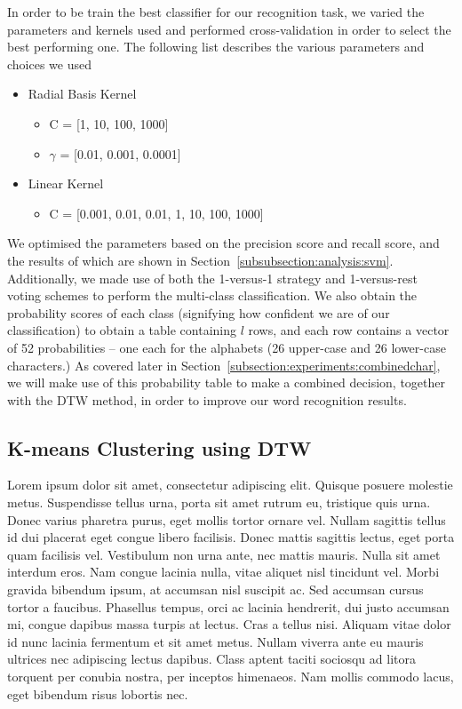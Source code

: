 \documentclass[12pt]{article}
\begin{document}
		In order to be train the best classifier for our recognition task, we varied the parameters and kernels used and performed cross-validation in order to select the best performing one. The following list describes the various parameters and choices we used

		\begin{itemize}
			\item Radial Basis Kernel
			\begin{itemize}
				\item C = [1, 10, 100, 1000]
				\item $\gamma$ = [0.01, 0.001, 0.0001]
			\end{itemize}
			\item Linear Kernel
			\begin{itemize}
				\item C = [0.001, 0.01, 0.01, 1, 10, 100, 1000]
			\end{itemize}
		\end{itemize}

		We optimised the parameters based on the precision score and recall score, and the results of which are shown in Section~\ref{subsubsection:analysis:svm}. Additionally, we made use of both the 1-versus-1 strategy and 1-versus-rest voting schemes to perform the multi-class classification. We also obtain the probability scores of each class (signifying how confident we are of our classification) to obtain a table containing $l$ rows, and each row contains a vector of 52 probabilities -- one each for the alphabets (26 upper-case and 26 lower-case characters.) As covered later in Section~\ref{subsection:experiments:combinedchar}, we will make use of this probability table to make a combined decision, together with the DTW method, in order to improve our word recognition results.

	
	\subsection{K-means Clustering using DTW}
	\label{subsection:experiments:dtw}
	Lorem ipsum dolor sit amet, consectetur adipiscing elit. Quisque posuere molestie metus. Suspendisse tellus urna, porta sit amet rutrum eu, tristique quis urna. Donec varius pharetra purus, eget mollis tortor ornare vel. Nullam sagittis tellus id dui placerat eget congue libero facilisis. Donec mattis sagittis lectus, eget porta quam facilisis vel. Vestibulum non urna ante, nec mattis mauris. Nulla sit amet interdum eros. Nam congue lacinia nulla, vitae aliquet nisl tincidunt vel. Morbi gravida bibendum ipsum, at accumsan nisl suscipit ac. Sed accumsan cursus tortor a faucibus. Phasellus tempus, orci ac lacinia hendrerit, dui justo accumsan mi, congue dapibus massa turpis at lectus. Cras a tellus nisi. Aliquam vitae dolor id nunc lacinia fermentum et sit amet metus. Nullam viverra ante eu mauris ultrices nec adipiscing lectus dapibus. Class aptent taciti sociosqu ad litora torquent per conubia nostra, per inceptos himenaeos. Nam mollis commodo lacus, eget bibendum risus lobortis nec.
	
\end{document}
